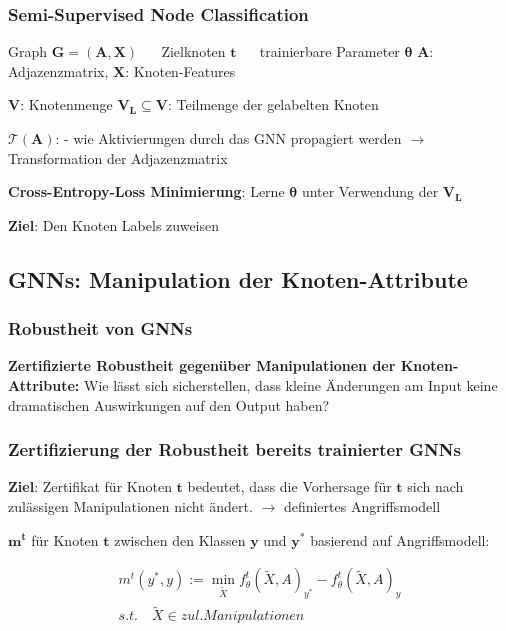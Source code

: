 \documentclass{beamer}
\begin{document}
\begin{frame}
  \frametitle{Semi-Supervised Node Classification}

  Graph $\boldsymbol{G} = (\boldsymbol{A}, \boldsymbol{X})$ $\quad$ Zielknoten $\boldsymbol{t}$ $\quad$ trainierbare Parameter $\boldsymbol{\theta}$\newline
  $\boldsymbol{A}$: Adjazenzmatrix, $\boldsymbol{X}$: Knoten-Features\newline

  $\boldsymbol{V}$: Knotenmenge\newline
  $\boldsymbol{V_L} \subseteq \boldsymbol{V}$: Teilmenge der gelabelten Knoten\newline

  $\boldsymbol{\mathcal{T}(A)}$:  - wie Aktivierungen durch das GNN propagiert werden
  $\rightarrow$ Transformation der Adjazenzmatrix\newline

  \textbf{Cross-Entropy-Loss Minimierung}:\newline
  Lerne $\boldsymbol{\theta}$ unter Verwendung der $\boldsymbol{V_L}$\newline

  \textbf{Ziel}: Den Knoten Labels zuweisen

\end{frame}

\subsection{GNNs: Manipulation der Knoten-Attribute}

\begin{frame}
  \frametitle{Robustheit von GNNs}
  \textbf{Zertifizierte Robustheit gegenüber Manipulationen der Knoten-Attribute:}\newline
  Wie lässt sich sicherstellen, dass kleine Änderungen am Input keine dramatischen Auswirkungen auf den Output haben?
\end{frame}

\begin{frame}
  \frametitle{Zertifizierung der Robustheit bereits trainierter GNNs}

  \textbf{Ziel}: Zertifikat für Knoten $\boldsymbol{t}$ bedeutet, dass die Vorhersage für $\boldsymbol{t}$ sich nach zulässigen Manipulationen nicht ändert.\newline
  $\rightarrow$ definiertes Angriffsmodell\newline

   $\boldsymbol{m^t}$ für Knoten $\boldsymbol{t}$ zwischen den Klassen $\boldsymbol{y}$ und $\boldsymbol{y^{\ast}}$ 
  basierend auf Angriffsmodell:

  \begin{gather} 
        m^t (y^*, y) := \min_{\tilde{X}} f_{\theta}^t(\tilde{X}, A)_{y^*} - f_{\theta}^t(\tilde{X}, A)_y \nonumber \\
        s.t. \quad \tilde{X} \in zul. Manipulationen \nonumber
    \end{gather}
\end{frame}
\end{document}
